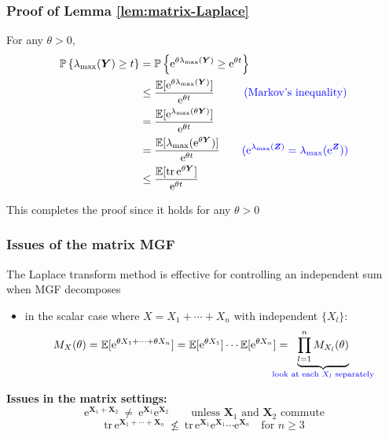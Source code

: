 \documentclass[compress,
mathserif,wide,%
]{beamer}
\begin{document}
\begin{frame}
\frametitle{Proof of Lemma \ref{lem:matrix-Laplace}}  

For any $\theta>0$,
\begin{align*}
\mathbb{P}\left\{ \lambda_{\max}(\bm{Y})\geq t\right\}  & =\mathbb{P}\left\{ \mathrm{e}^{\theta\lambda_{\max}(\bm{Y})}\geq\mathrm{e}^{\theta t}\right\} \\
	& \leq\frac{\mathbb{E}[\mathrm{e}^{\theta\lambda_{\max}(\bm{Y})}]}{\mathrm{e}^{\theta t}}\qquad ~~\textcolor{blue}{ (\text{Markov's inequality})}\\
 	& =\frac{\mathbb{E}[\mathrm{e}^{\lambda_{\max}(\theta\bm{Y})}]}{\mathrm{e}^{\theta t}}\\
	& =\frac{\mathbb{E}[\lambda_{\max}(\mathrm{e}^{\theta\bm{Y}})]}{\mathrm{e}^{\theta t}}\qquad  \textcolor{blue}{ (\mathrm{e}^{\lambda_{\max}(\bm{Z})}=\lambda_{\max}(\mathrm{e}^{\bm{Z}}))}\\
 	& \leq\frac{\mathbb{E}[\mathrm{tr}\,\mathrm{e}^{\theta\bm{Y}}]}{\mathrm{e}^{\theta t}}
\end{align*}

This completes the proof since it holds for any $\theta>0$ 

\end{frame}




\begin{frame}
\frametitle{Issues of the matrix MGF}  

The Laplace transform method is effective for controlling an independent sum when MGF decomposes

\begin{itemize}
	\item in the scalar case where $X=X_{1}+\cdots+X_{n}$ with independent $\{X_{l}\}$:
	\[
		M_{X}(\theta)=\mathbb{E}[\mathrm{e}^{\theta X_1 + \cdots + \theta X_n}]= \mathbb{E}[\mathrm{e}^{\theta X_{1}}] \cdots \mathbb{E}[\mathrm{e}^{\theta X_{n}}] = \hspace{-1.7em}\underset{\textcolor{blue}{ \text{look at each }X_l\text{ separately}}}{\underbrace{ \prod_{l=1}^{n} M_{X_{l}}(\theta) }}
	\]
\end{itemize}

\vfill

{\bf Issues in the matrix settings:} 
%
\[
	\mathrm{e}^{\bm{X}_{1}+\bm{X}_{2}} ~\neq~ \mathrm{e}^{\bm{X}_{1}}\mathrm{e}^{\bm{X}_{2}}\qquad\text{unless }\bm{X}_{1}\text{ and }\bm{X}_{2}\text{ commute}
\]
%
\[
	\mathrm{tr}\,\mathrm{e}^{\bm{X}_{1}+\cdots+\bm{X}_{n}} ~\nleq~ \mathrm{tr}\,\mathrm{e}^{\bm{X}_{1}}\mathrm{e}^{\bm{X}_{1}}\cdots\mathrm{e}^{\bm{X}_{n}} \quad \text{for } n  \geq 3
\]

\end{frame}
\end{document}
